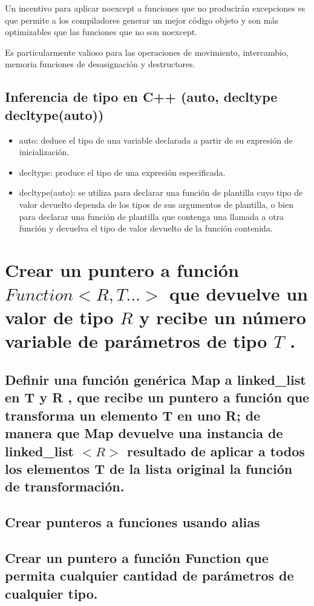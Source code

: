 \documentclass[10pt]{article}
\begin{document}
Un incentivo para aplicar noexcept a funciones que no producir\'an excepciones es que permite a los compiladores generar un mejor código objeto y son más optimizables que las funciones que no son noexcept.

Es particularmente valioso para las operaciones de movimiento, intercambio, memoria funciones de desasignación y destructores.

\subsection{Inferencia de tipo en C++ (auto, decltype decltype(auto))}

\begin{itemize}
	\item auto: deduce el tipo de una variable declarada a partir de su expresión de inicialización.
	\item decltype: produce el tipo de una expresión especificada.
	\item decltype(auto): se utiliza para declarar una función de plantilla cuyo tipo de valor devuelto dependa de los tipos de sus argumentos de plantilla, o bien para declarar una función de plantilla que contenga una llamada a otra función y devuelva el tipo de valor devuelto de la función contenida.
\end{itemize}

\vspace{2em}
\section{Crear un puntero a función $ Function<R, T...> $ que devuelve un valor de tipo $ R $ y recibe un número variable de parámetros de tipo $ T $ .}

\subsection{Definir una función genérica Map a linked\_list en T y R , que recibe un puntero a función que transforma un elemento T en uno R; de manera que Map devuelve una instancia de linked\_list $ <R> $  resultado de aplicar a todos los elementos T de la lista original la función de transformación.}

\subsection{Crear punteros a funciones usando alias }

\subsection{Crear un puntero a función Function que permita cualquier cantidad de parámetros de cualquier tipo.}


\end{document}
